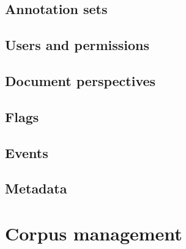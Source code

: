 \documentclass[a4paper,10pt,oneside]{scrbook}
\begin{document}
\section{Annotation sets}
\label{sec:corpus-settings-annotations}

\section{Users and permissions}

\section{Document perspectives}

\section{Flags}

\section{Events}

\section{Metadata}


\chapter{Corpus management}
\end{document}
